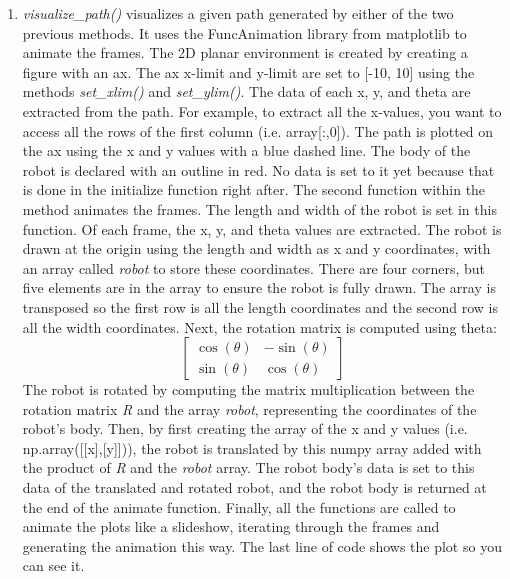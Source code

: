 \documentclass{article}
\begin{document}
\begin{enumerate}
\item \textit{visualize\_path()} visualizes a given path generated by either of the two previous methods. It uses the FuncAnimation library from matplotlib to animate the frames. The 2D planar environment is created by creating a figure with an ax. The ax x-limit and y-limit are set to [-10, 10] using the methods \textit{set\_xlim()} and \textit{set\_ylim()}. The data of each x, y, and theta are extracted from the path. For example, to extract all the x-values, you want to access all the rows of the first column (i.e. array[:,0]). The path is plotted on the ax using the x and y values with a blue dashed line. The body of the robot is declared with an outline in red. No data is set to it yet because that is done in the initialize function right after. The second function within the method animates the frames. The length and width of the robot is set in this function. Of each frame, the x, y, and theta values are extracted. The robot is drawn at the origin using the length and width as x and y coordinates, with an array called \textit{robot} to store these coordinates. There are four corners, but five elements are in the array to ensure the robot is fully drawn. The array is transposed so the first row is all the length coordinates and the second row is all the width coordinates. Next, the rotation matrix is computed using theta:
\[
\begin{bmatrix}
\cos(\theta) & -\sin(\theta) \\
\sin(\theta) & \cos(\theta)
\end{bmatrix}
\]
The robot is rotated by computing the matrix multiplication between the rotation matrix \textit{R} and the array \textit{robot}, representing the coordinates of the robot's body. Then, by first creating the array of the x and y values (i.e. np.array([[x],[y]])), the robot is translated by this numpy array added with the product of \textit{R} and the \textit{robot} array. The robot body's data is set to this data of the translated and rotated robot, and the robot body is returned at the end of the animate function. Finally, all the functions are called to animate the plots like a slideshow, iterating through the frames and generating the animation this way. The last line of code shows the plot so you can see it.
\end{enumerate}
\end{document}
